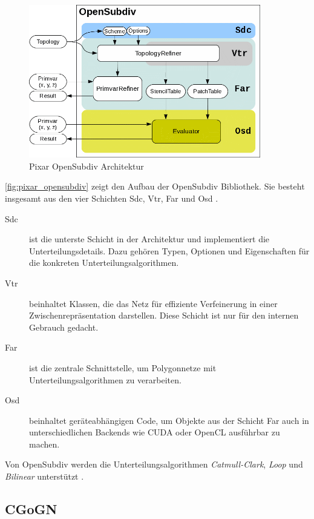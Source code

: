 \begin{figure}
  \centering
  \includegraphics[width=0.9\textwidth]{content/media/pixar_opensubdiv}
  \caption{Pixar OpenSubdiv Architektur \cite{Pixar.27.07.2015}}
  \label{fig:pixar_opensubdiv}
\end{figure}

\autoref{fig:pixar_opensubdiv} zeigt den Aufbau der OpenSubdiv Bibliothek.
Sie besteht insgesamt aus den vier Schichten Sdc, Vtr, Far und Osd \cite{Pixar.27.07.2015}.

\begin{description}
 \item[Sdc] ist die unterste Schicht in der Architektur und implementiert die Unterteilungsdetails.
 Dazu gehören Typen, Optionen und Eigenschaften für die konkreten Unterteilungsalgorithmen.
 \item[Vtr] beinhaltet Klassen, die das Netz für effiziente Verfeinerung in einer Zwischenrepräsentation darstellen.
 Diese Schicht ist nur für den internen Gebrauch gedacht.
 \item[Far] ist die zentrale Schnittstelle, um Polygonnetze mit Unterteilungsalgorithmen zu verarbeiten.
 \item[Osd] beinhaltet geräteabhängigen Code, um Objekte aus der Schicht Far auch in unterschiedlichen Backends wie
  CUDA oder OpenCL ausführbar zu machen.
\end{description}

Von OpenSubdiv werden die Unterteilungsalgorithmen \emph{Catmull-Clark}, \emph{Loop} und \emph{Bilinear} unterstützt \cite{Pixar.27.07.2015}. 

\subsection{CGoGN}

